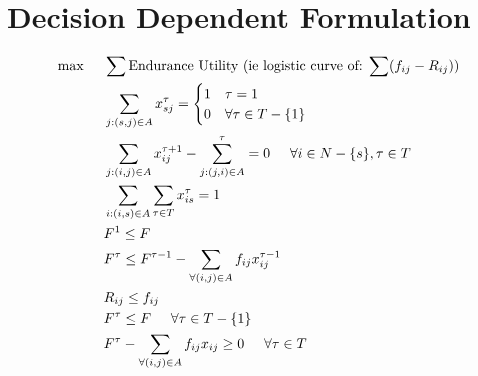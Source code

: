 \section{Decision Dependent Formulation}
\begin{align}
\max \hspace{0.5cm} &\sum \text{Endurance Utility (ie logistic curve of: $\sum(f_{ij}-R_{ij}$))}\\
&\sum_{j:(s,j)\in A} x_{sj}^{\tau} = \begin{cases}
1 & \tau = 1\\
0 & \forall\tau\in T-\{1\} \end{cases} \\
&\sum_{j:(i,j)\in A} x_{ij}^{\tau+1}-\sum_{j:(j,i)\in A}^{\tau} = 0 \hspace{0.5cm} \forall i\in N-\{s\},\tau \in T\\
&\sum_{i:(i,s)\in A}\sum_{\tau\in T} x_{is}^\tau = 1\\
&F^1\leq F\\
&F^\tau \leq F^{\tau-1}-\sum_{\forall(i,j)\in A} f_{ij} x_{ij}^{\tau-1}\\
&R_{ij}\leq f_{ij}\\
&F^\tau \leq F \hspace{0.5cm} \forall \tau \in T-\{1\}\\
&F^\tau -\sum_{\forall (i,j)\in A} f_{ij}x_{ij}\geq 0 \hspace{0.5cm} \forall \tau \in T
\end{align}